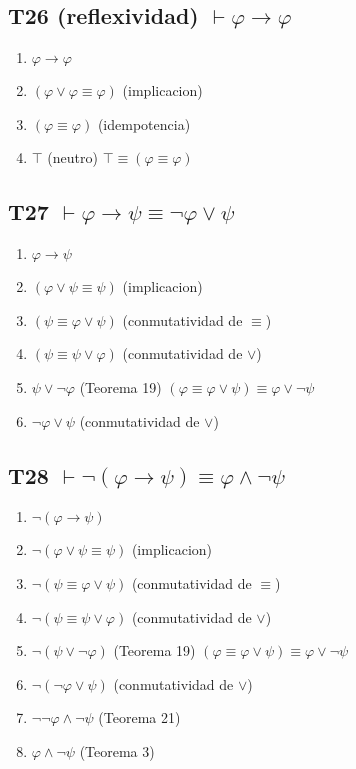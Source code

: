 \documentclass[a4paper,11pt]{article}
\begin{document}
\subsection{T26 (reflexividad) $\vdash \varphi \rightarrow \varphi $}

\begin{enumerate}
    \item $\varphi \rightarrow \varphi$
    \item $(\varphi \lor \varphi \equiv \varphi)$ \hfill (implicacion)
    \item $(\varphi \equiv \varphi)$ \hfill (idempotencia)
    \item $\top$ \hfill (neutro) $\top \equiv (\varphi \equiv \varphi)$
\end{enumerate}

\subsection{T27 $\vdash \varphi \rightarrow \psi \equiv \neg\varphi \lor \psi $}

\begin{enumerate}
    \item $\varphi \rightarrow \psi$
    \item $(\varphi \lor \psi \equiv \psi)$ \hfill (implicacion)
    \item $(\psi \equiv \varphi \lor \psi)$ \hfill (conmutatividad de $\equiv$)
    \item $(\psi \equiv \psi \lor \varphi)$ \hfill (conmutatividad de $\lor$)
    \item $\psi \lor \neg\varphi$ \hfill (Teorema 19) $(\varphi \equiv \varphi \lor \psi) \equiv \varphi \lor \neg\psi$
    \item $\neg\varphi \lor \psi$ \hfill (conmutatividad de $\lor$)
\end{enumerate}

\subsection{T28 $\vdash \neg(\varphi \rightarrow \psi) \equiv \varphi \land \neg\psi $}

\begin{enumerate}
    \item $\neg(\varphi \rightarrow \psi)$
    \item $\neg(\varphi \lor \psi \equiv \psi)$ \hfill (implicacion)
    \item $\neg(\psi \equiv \varphi \lor \psi)$ \hfill (conmutatividad de $\equiv$)
    \item $\neg(\psi \equiv \psi \lor \varphi)$ \hfill (conmutatividad de $\lor$)
    \item $\neg(\psi \lor \neg\varphi)$ \hfill (Teorema 19) $(\varphi \equiv \varphi \lor \psi) \equiv \varphi \lor \neg\psi$
    \item $\neg(\neg\varphi \lor \psi)$ \hfill (conmutatividad de $\lor$)
    \item $\neg\neg\varphi \land \neg\psi$ \hfill (Teorema 21)
    \item $\varphi \land \neg\psi$ \hfill (Teorema 3)
\end{enumerate}
\end{document}
